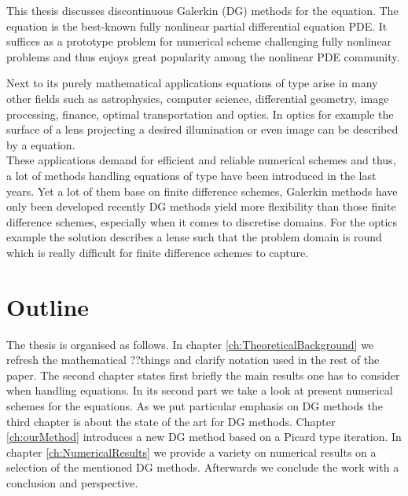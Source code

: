 This thesis discusses discontinuous Galerkin (DG) methods for the \MA equation. 
The \MA equation is the best-known fully nonlinear partial differential equation PDE. It suffices as a prototype problem for numerical scheme challenging fully nonlinear problems and thus enjoys great popularity among the nonlinear PDE community.

Next to its purely mathematical applications equations of \MA type arise in many other fields such as astrophysics, computer science, differential geometry, image processing, finance, optimal transportation and optics\cite{FGN2013}. 
In optics for example the surface of a lens projecting a desired illumination or even image can be described by a \MA equation\cite{KW2010, BHP2014}. \\
These applications demand for efficient and reliable numerical schemes and thus, a lot of methods handling equations of \MA type have been introduced in the last years. Yet a lot of them base on finite difference schemes, Galerkin methods have only been developed recently \cite{Boehmer2008, FN2009a, Awanou2010, BGN+2011, Neilan2014} DG methods yield more flexibility than those finite difference schemes, especially when it comes to discretise domains. For the optics example the solution describes a lense such that the problem domain is round which is really difficult for finite difference schemes to capture.

\section*{Outline}
The thesis is organised as follows. In chapter \ref{ch:TheoreticalBackground} we refresh the mathematical ??things and clarify notation used in the rest of the paper.
The second chapter states first briefly the main results one has to consider when handling \MA equations. In its second part we take a look at present numerical schemes for the \MA equations. As we put particular emphasis on DG methods the third chapter is about the state of the art for DG methods.
Chapter \ref{ch:ourMethod} introduces a new DG method based on a Picard type iteration. In chapter \ref{ch:NumericalResults} we provide a variety on numerical results on a selection of the mentioned DG methods.
Afterwards we conclude the work with a conclusion and perspective.